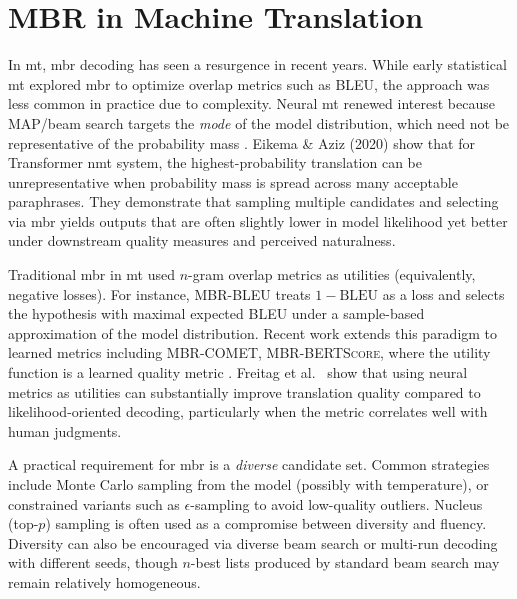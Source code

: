 \section{MBR in Machine Translation}

In \gls{mt}, \gls{mbr} decoding has seen a resurgence in recent years. While early statistical \gls{mt} explored \gls{mbr} to optimize overlap metrics such as BLEU, the approach was less common in practice due to complexity. Neural \gls{mt} renewed interest because MAP/beam search targets the \emph{mode} of the model distribution, which need not be representative of the probability mass \cite{eikema2021beyondbeam}. Eikema \& Aziz (2020)\cite{eikema2021beyondbeam} show that for Transformer \gls{nmt} system, the highest-probability translation can be unrepresentative when probability mass is spread across many acceptable paraphrases. They demonstrate that sampling multiple candidates and selecting via \gls{mbr} yields outputs that are often slightly lower in model likelihood yet better under downstream quality measures and perceived naturalness\cite{eikema2021beyondbeam}.

Traditional \gls{mbr} in \gls{mt} used $n$-gram overlap metrics as utilities (equivalently, negative losses). For instance, \textsc{MBR-BLEU} treats $1-\text{BLEU}$ as a loss and selects the hypothesis with maximal expected BLEU under a sample-based approximation of the model distribution. Recent work extends this paradigm to learned metrics including \textsc{MBR-COMET}, \textsc{MBR-BERTScore}, where the utility function is a learned quality metric \cite{mbr_neural_metrics_2021,rei2020comet}. Freitag et al.\ \cite{mbr_neural_metrics_2021} show that using neural metrics as utilities can substantially improve translation quality compared to likelihood-oriented decoding, particularly when the metric correlates well with human judgments.

A practical requirement for \gls{mbr} is a \emph{diverse} candidate set. Common strategies include Monte Carlo sampling from the model (possibly with temperature), or constrained variants such as $\epsilon$-sampling to avoid low-quality outliers\cite{eikema2021beyondbeam}. Nucleus (top-$p$) sampling is often used as a compromise between diversity and fluency\cite{holtzman2019curious}. Diversity can also be encouraged via diverse beam search or multi-run decoding with different seeds, though $n$-best lists produced by standard beam search may remain relatively homogeneous.


